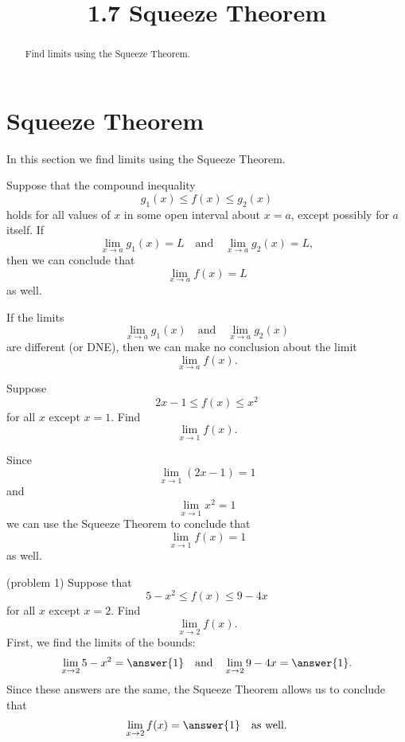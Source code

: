 \documentclass{ximera}
\title{1.7 Squeeze Theorem}
\begin{document}
\begin{abstract}
Find limits using the Squeeze Theorem.
\end{abstract}

\maketitle

\section{Squeeze Theorem}
 

In this section we find limits using the Squeeze Theorem.

\begin{theorem} 
Suppose that the compound inequality
\[
g_1(x) \leq f(x) \leq g_2(x)
\]
holds for all values of $x$ in some open interval about $x=a$, except possibly for $a$ itself.
If
\[
\lim_{x\to a} g_1(x) = L \quad \text{and} \quad \lim_{x\to a} g_2(x) = L,
\]
then we can conclude that
\[
\lim_{x\to a} f(x) = L
\]
as well.

\end{theorem}


\begin{remark}
If the limits
\[
\lim_{x\to a} g_1(x)  \quad \text{and} \quad \lim_{x\to a} g_2(x)
\]
are different (or DNE), then we can make no conclusion about the limit
\[
\lim_{x\to a} f(x).
\]
\end{remark}

\begin{example}[example 1]
Suppose 
\[
 2x-1 \leq f(x) \leq x^2
\]
for all $x$ except $x=1$.
Find
\[
\lim_{x\to 1} f(x).
\]

Since
\[
\lim_{x\to 1} (2x-1) = 1
\]
and
\[
\lim_{x\to 1} x^2 = 1
\]
we can use the Squeeze Theorem to conclude that
\[
\lim_{x\to 1} f(x) = 1
\]
as well.

\end{example}

\begin{problem}(problem 1)
Suppose that 
\[
 5-x^2\leq f(x) \leq 9-4x
\]
for all $x$ except $x=2$.
Find
\[
\lim_{x\to 2} f(x).
\]
First, we find the limits of the bounds:
\[
\lim_{x \to 2} 5 - x^2 = \answer{1} \quad \text{and} \quad  \lim_{x \to 2} 9-4x = \answer{1}.
\]
Since these answers are the same, the Squeeze Theorem allows us to conclude that 
\[
\lim_{x \to 2} f(x) = \answer{1} \quad \text{as well}.
\]

\end{problem}
\end{document}
